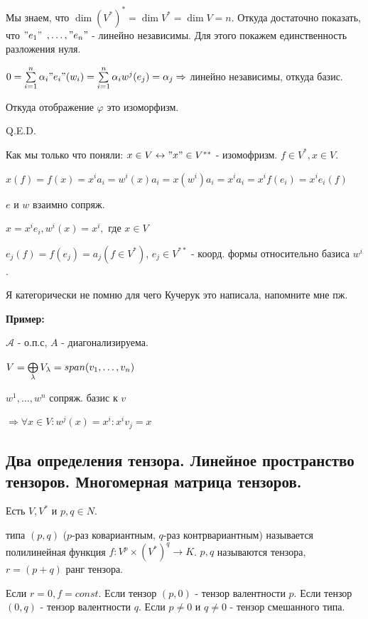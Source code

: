 Мы знаем, что $\dim (V^*)^* = \dim V^* = \dim V = n$. Откуда достаточно показать, что $"e_1"$ $,\ldots, "e_n"$ - линейно независимы. Для этого покажем единственность разложения нуля.

$0= \sum\limits_{i=1}^n \alpha_i "e_i"(w_i)=\sum\limits_{i=1}^n\alpha_i w^j(e_j) = \alpha_j \Rightarrow$ линейно независимы, откуда базис.

Откуда отображение $\varphi$ это изоморфизм.

\hfill Q.E.D.

Как мы только что поняли: $x \in V \leftrightarrow "x" \in V^{**}$ - изомофризм. $f\in V^{*}, x \in V$.

$x(f)= f(x) = x^i a_i = w^i(x) a_i = x(w^i)a_i =x^ia_i=x^i f(e_i)=x^ie_i(f)$

$e \text{ и }w$ взаимно сопряж.

$x=x^ie_i, w^i(x)=x^i,$ где $x \in V$

$e_j(f)=f(e_j)=a_j(f \in V^*)$, $e_j \in V^{**}$ - коорд. формы относительно базиса $w^i$.

Я категорически не помню для чего Кучерук это написала, напомните мне пж.





\textbf{Пример:}

$\mathcal{A}$ - о.п.с, $A$ - диагонализируема.

$V = \bigoplus\limits_{\lambda}V_{\lambda} = span (v_1,\ldots,v_n)$

$w^1,\ldots,w^n$ сопряж. базис к $v$  %

$\Rightarrow \forall x \in V: w^j(x) =x^i: x^iv_j = x$ 

\newpage
\subsection{Два определения тензора. Линейное пространство тензоров. Многомерная матрица тензоров.}

 Есть $V,V^*$ и $p,q \in N$.

 типа $(p,q)$ ($p$-раз ковариантным, $q$-раз контрвариантным) называется полилинейная функция $f: V^p\times (V^*)^q \rightarrow K$. $p,q$ называются  тензора, $r = (p+q)$ ранг тензора.

Если $r = 0, f = const$. Если тензор $(p,0) $ -  тензор валентности $p$. Если тензор $(0,q)$ -  тензор валентности $q$. Если $p\neq 0 $ и $q\neq 0$ - тензор смешанного типа.

